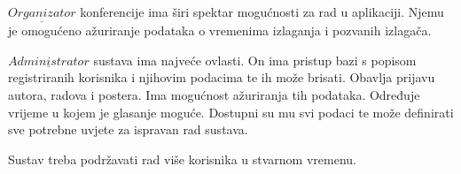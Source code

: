 		$\underline{Organizator}$ konferencije ima širi spektar mogućnosti za rad u aplikaciji. Njemu je omogućeno ažuriranje podataka o vremenima izlaganja i pozvanih izlagača. 
		
		$\underline{Administrator}$ sustava ima najveće ovlasti. On ima pristup bazi s popisom registriranih korisnika i njihovim podacima te ih može brisati. Obavlja prijavu autora, radova i postera. Ima mogućnost ažuriranja tih podataka. Određuje vrijeme u kojem je glasanje moguće. Dostupni su mu svi podaci te može definirati sve potrebne uvjete za ispravan rad sustava. 

		
		Sustav treba podržavati rad više korisnika u stvarnom vremenu. 

		
		\eject
		
